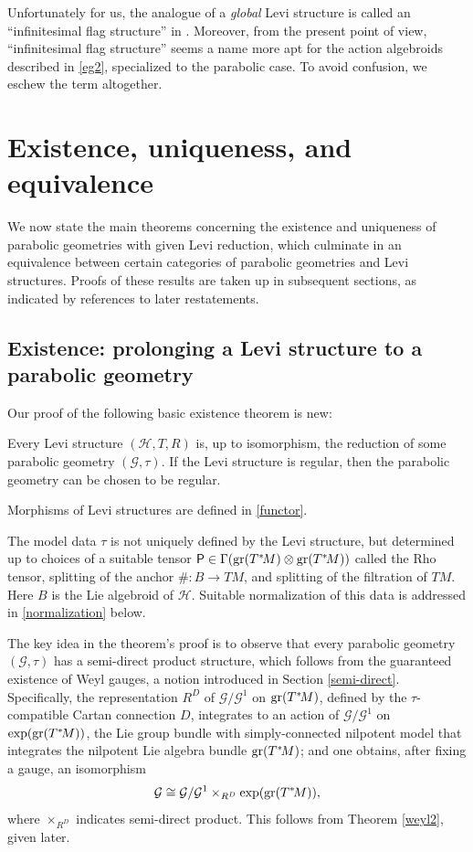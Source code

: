 \documentclass[leqno,12pt]{amsart} %
\newcommand\refreshpage{\newpage}
\newcommand\refreshpage{}
\begin{document}
\vspace{\baselineskip} Unfortunately for us, the analogue of a {\em global} Levi structure
is called an ``infinitesimal flag structure'' in \cite{Cap_Slovak_09}. Moreover, from the
present point of view, ``infinitesimal flag structure'' seems a name more apt for the
action algebroids described in \ref{eg2}, specialized to the parabolic case. To avoid
confusion, we eschew the term altogether.

\refreshpage
\section{Existence, uniqueness, and equivalence}\label{theoremsection}
We now state the main theorems concerning the existence and uniqueness of parabolic
geometries with given Levi reduction, which culminate in an equivalence between certain
categories of parabolic geometries and Levi structures. Proofs of these results are taken
up in subsequent sections, as indicated by references to later restatements.

\subsection{Existence: prolonging a Levi structure to a parabolic
  geometry}\label{existence}
Our proof of the following basic existence theorem is new:
\begin{theorem}
  Every Levi structure $({\mathcal H}, T, R)$ is, up to isomorphism, the reduction of some
  parabolic geometry $({\mathcal G}, \tau)$. If the Levi structure is regular, then the
  parabolic geometry can be chosen to be regular.
\end{theorem}
\noindent%
Morphisms of Levi structures are defined in \ref{functor}.

The model data $\tau $ is not uniquely defined by the Levi structure, but determined up to
choices of a suitable tensor
${\mathsf P} \in \Gamma(\operatorname{\operatorname{gr}}(T^*\!M)\otimes \operatorname{\operatorname{gr}}(T^*\!M))$ called the {\df Rho
  tensor}, splitting of the anchor $\# \colon B \rightarrow TM $, and splitting of the
filtration of $TM$. Here $B$ is the Lie algebroid of ${\mathcal H}$. Suitable
normalization of this data is addressed in \ref{normalization} below.

The key idea in the theorem's proof is to observe that every parabolic geometry
$({\mathcal G}, \tau)$ has a semi-direct product structure, which follows from the
guaranteed existence of Weyl gauges, a notion introduced in Section
\ref{semi-direct}. Specifically, the representation $R^D$ of ${\mathcal G}/{\mathcal G}^1$
on $\operatorname{\operatorname{gr}}(T^*\!M)$, defined by the $\tau $-compatible Cartan connection $D$, integrates
to an action of ${\mathcal G}/{\mathcal G}^1$ on $\exp(\operatorname{\operatorname{gr}}(T^*\!M))$, the Lie group
bundle with simply-connected nilpotent model that integrates the nilpotent Lie algebra
bundle $\operatorname{\operatorname{gr}}(T^*\!M)$; and one obtains, after fixing a gauge, an isomorphism
\begin{equation*}
    {\mathcal G} \cong {\mathcal G}/{\mathcal G}^1 \times_{R^D} \exp(\operatorname{\operatorname{gr}}(T^*\!M)),
\end{equation*}
where $\times_{R^D}$ indicates semi-direct product. This follows from Theorem \ref{weyl2},
given later.
\end{document}
